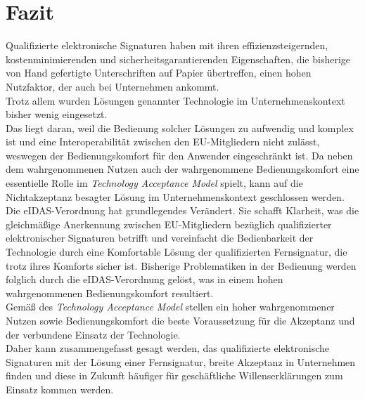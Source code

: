 \documentclass[deutsch]{lib/llncs/llncs}
\begin{document}
\section{Fazit}
Qualifizierte elektronische Signaturen haben mit ihren effizienzsteigernden, kostenminimierenden und sicherheitsgarantierenden Eigenschaften, die bisherige von Hand gefertigte Unterschriften auf Papier übertreffen, einen hohen Nutzfaktor, der auch bei Unternehmen ankommt. \\
Trotz allem wurden Lösungen genannter Technologie im Unternehmenskontext bisher wenig eingesetzt. \\
Das liegt daran, weil die Bedienung solcher Lösungen zu aufwendig und komplex ist und eine Interoperabilität zwischen den EU-Mitgliedern nicht zulässt, weswegen der Bedienungskomfort für den Anwender eingeschränkt ist. Da neben dem wahrgenommenen Nutzen auch der wahrgenommene Bedienungskomfort eine essentielle Rolle im \textit{Technology Acceptance Model} spielt, kann auf die Nichtakzeptanz besagter Lösung im Unternehmenskontext geschlossen werden. \\
Die eIDAS-Verordnung hat grundlegendes Verändert. Sie schafft Klarheit, was die gleichmäßige Anerkennung zwischen EU-Mitgliedern bezüglich qualifizierter elektronischer Signaturen betrifft und vereinfacht die Bedienbarkeit der Technologie durch eine Komfortable Lösung der qualifizierten Fernsignatur, die trotz ihres Komforts sicher ist. Bisherige Problematiken in der Bedienung werden folglich durch die eIDAS-Verordnung gelöst, was in einem hohen wahrgenommenen Bedienungskomfort resultiert. \\
Gemäß des \textit{Technology Acceptance Model} stellen ein hoher wahrgenommener Nutzen sowie Bedienungskomfort die beste Voraussetzung für die Akzeptanz und der verbundene Einsatz der Technologie. \\
Daher kann zusammengefasst gesagt werden, das qualifizierte elektronische Signaturen mit der Lösung einer Fernsignatur, breite Akzeptanz in Unternehmen finden und diese in Zukunft häufiger für geschäftliche Willenserklärungen zum Einsatz kommen werden.




\end{document}
